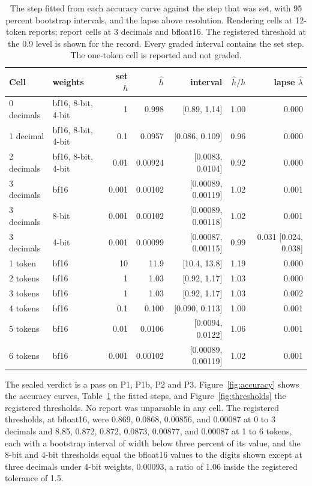 \documentclass{article}
\theoremstyle{definition}
\theoremstyle{remark}
\begin{document}
\begin{table}[t]
\centering
\small
\caption{The step fitted from each accuracy curve against the step that was set, with 95 percent bootstrap intervals, and the lapse above resolution.
Rendering cells at 12-token reports; report cells at 3 decimals and bfloat16.
The registered threshold at the 0.9 level is shown for the record.
Every graded interval contains the set step. The one-token cell is reported and not graded.}
\label{tab:fit}
\begin{tabular}{llrrrrr}
\toprule
Cell & weights & set $h$ & $\hat h$ & interval & $\hat h/h$ & lapse $\hat\lambda$ \\
\midrule
0 decimals & bf16, 8-bit, 4-bit & 1 & 0.998 & [0.89, 1.14] & 1.00 & 0.000 \\
1 decimal & bf16, 8-bit, 4-bit & 0.1 & 0.0957 & [0.086, 0.109] & 0.96 & 0.000 \\
2 decimals & bf16, 8-bit, 4-bit & 0.01 & 0.00924 & [0.0083, 0.0104] & 0.92 & 0.000 \\
3 decimals & bf16 & 0.001 & 0.00102 & [0.00089, 0.00119] & 1.02 & 0.001 \\
3 decimals & 8-bit & 0.001 & 0.00102 & [0.00089, 0.00118] & 1.02 & 0.001 \\
3 decimals & 4-bit & 0.001 & 0.00099 & [0.00087, 0.00115] & 0.99 & 0.031 [0.024, 0.038] \\
\midrule
1 token & bf16 & 10 & 11.9 & [10.4, 13.8] & 1.19 & 0.000 \\
2 tokens & bf16 & 1 & 1.03 & [0.92, 1.17] & 1.03 & 0.000 \\
3 tokens & bf16 & 1 & 1.03 & [0.92, 1.17] & 1.03 & 0.002 \\
4 tokens & bf16 & 0.1 & 0.100 & [0.090, 0.113] & 1.00 & 0.001 \\
5 tokens & bf16 & 0.01 & 0.0106 & [0.0094, 0.0122] & 1.06 & 0.001 \\
6 tokens & bf16 & 0.001 & 0.00102 & [0.00089, 0.00119] & 1.02 & 0.001 \\
\bottomrule
\end{tabular}
\end{table}

The sealed verdict is a pass on P1, P1b, P2 and P3.
Figure~\ref{fig:accuracy} shows the accuracy curves, Table~\ref{tab:fit} the fitted steps, and Figure~\ref{fig:thresholds} the registered thresholds.
No report was unparsable in any cell.
The registered thresholds, at bfloat16, were 0.869, 0.0868, 0.00856, and 0.00087 at 0 to 3 decimals and 8.85, 0.872, 0.872, 0.0873, 0.00877, and 0.00087 at 1 to 6 tokens, each with a bootstrap interval of width below three percent of its value, and the 8-bit and 4-bit thresholds equal the bfloat16 values to the digits shown except at three decimals under 4-bit weights, 0.00093, a ratio of 1.06 inside the registered tolerance of 1.5.
\end{document}
